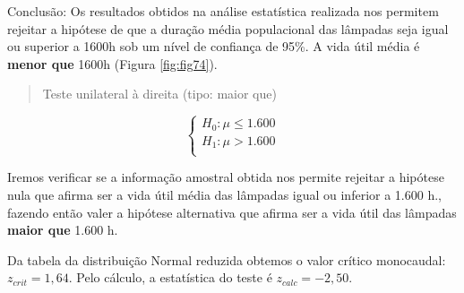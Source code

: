 \documentclass[
]{book}
\begin{document}
\hfill\break

Conclusão: Os resultados obtidos na análise estatística realizada nos permitem rejeitar a hipótese de que a duração média populacional das lâmpadas seja igual ou superior a 1600h sob um nível de confiança de 95\%. A vida útil média é \textbf{menor que} 1600h (Figura \ref{fig:fig74}).

\hfill\break

\begin{quote}
Teste unilateral à direita (tipo: maior que)
\end{quote}

\hfill\break

\[
\begin{cases}
H_{0}: \mu \le 1.600 \\
H_{1}: \mu > 1.600 \\
\end{cases} 
\]

\hfill\break

Iremos verificar se a informação amostral obtida nos permite rejeitar a hipótese nula que afirma ser a vida útil média das lâmpadas igual ou inferior a 1.600 h., fazendo então valer a hipótese alternativa que afirma ser a vida útil das lâmpadas \textbf{maior que} 1.600 h.

\hfill\break

Da tabela da distribuição Normal reduzida obtemos o valor crítico monocaudal: \({z}_{crit}=1,64\). Pelo cálculo, a estatística do teste é \(z_{calc}=-2,50\).

\hfill\break
\end{document}
